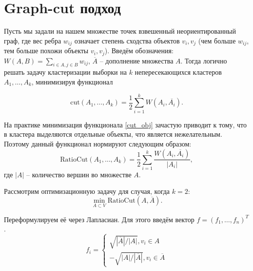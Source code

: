 \documentclass[12pt,a4paper]{article}
\begin{document}
\section{Graph-cut подход}

Пусть мы задали на нашем множестве точек взвешенный неориентированный граф, где вес ребра $w_{ij}$ означает степень сходства объектов $v_i,v_j$ (чем больше $w_{ij}$, тем больше похожи объекты $v_i,v_j$). Введём обозначения: $W(A,B) = \sum_{i\in A, j \in B} w_{ij}$, $\overline{A}$ – дополнение множества $A$. Тогда логично решать задачу кластеризации выборки на $k$ непересекающихся кластеров $A_1, \ldots, A_k$, минимизируя функционал

\begin{equation}
	\text{cut}(A_1, \ldots, A_k) = \frac{1}{2}\sum_{i=1}^k W(A_i, \overline{A_i}).
	\label{cut_obj}
\end{equation}

На практике минимизация функционала \ref{cut_obj} зачастую приводит к тому, что в кластера выделяются отдельные объекты, что является нежелательным. Поэтому данный функционал нормируют следующим образом:
\begin{equation}
	\text{RatioCut}(A_1, \ldots, A_k) = \frac{1}{2}\sum_{i=1}^k \frac{W(A_i, \overline{A_i})}{|A_i|},
	\label{ratiocut_obj}
\end{equation}
где $|A|$ – количество вершин во множестве $A$.


Рассмотрим оптимизационную задачу для случая, когда $k=2$:
\begin{equation*}
	\min_{A \subset V} \text{RatioCut}(A, \overline{A}).
\end{equation*}

Переформулируем её через Лапласиан. Для этого введём вектор $f = (f_1, \ldots, f_n)^T$.
\begin{equation*}
	f_i = 
	\begin{cases}
		\sqrt{|\overline{A}|/|A|}, v_i \in A \\
		-\sqrt{|A|/|\overline{A}|}, v_i \in \overline{A}
	\end{cases}
\end{equation*}
\end{document}
